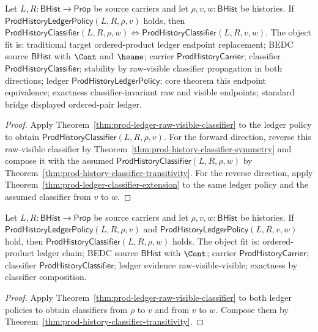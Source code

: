 \begin{theorem}
\label{thm:prod-ledger-classifier-endpoint-equivalence}
Let $L,R:\mathsf{BHist}\to\mathsf{Prop}$ be source carriers and let
$\rho,v,w:\mathsf{BHist}$ be histories. If
$\mathsf{ProdHistoryLedgerPolicy}(L,R,\rho,v)$ holds, then
$\mathsf{ProdHistoryClassifier}(L,R,\rho,w) \Longleftrightarrow
\mathsf{ProdHistoryClassifier}(L,R,v,w)$. The object fit is:
traditional target ordered-product ledger endpoint replacement; BEDC source
$\mathsf{BHist}$ with $\Cont$ and $\hsame$; carrier
$\mathsf{ProdHistoryCarrier}$; classifier $\mathsf{ProdHistoryClassifier}$;
stability by raw-visible classifier propagation in both directions; ledger
$\mathsf{ProdHistoryLedgerPolicy}$; core theorem this endpoint equivalence;
exactness classifier-invariant raw and visible endpoints; standard bridge
displayed ordered-pair ledger.
\end{theorem}
\begin{proof}
Apply Theorem~\ref{thm:prod-ledger-raw-visible-classifier} to the ledger
policy to obtain $\mathsf{ProdHistoryClassifier}(L,R,\rho,v)$. For the forward
direction, reverse this raw-visible classifier by
Theorem~\ref{thm:prod-history-classifier-symmetry} and compose it with the
assumed $\mathsf{ProdHistoryClassifier}(L,R,\rho,w)$ by
Theorem~\ref{thm:prod-history-classifier-transitivity}. For the reverse
direction, apply
Theorem~\ref{thm:prod-ledger-classifier-extension} to the same ledger policy
and the assumed classifier from $v$ to $w$.
\end{proof}

\begin{theorem}
\label{thm:prod-ledger-two-step-classifier-composition}
Let $L,R:\mathsf{BHist}\to\mathsf{Prop}$ be source carriers and let
$\rho,v,w:\mathsf{BHist}$ be histories. If
$\mathsf{ProdHistoryLedgerPolicy}(L,R,\rho,v)$ and
$\mathsf{ProdHistoryLedgerPolicy}(L,R,v,w)$ hold, then
$\mathsf{ProdHistoryClassifier}(L,R,\rho,w)$ holds. The object fit is:
ordered-product ledger chain; BEDC source $\mathsf{BHist}$ with $\Cont$;
carrier $\mathsf{ProdHistoryCarrier}$; classifier
$\mathsf{ProdHistoryClassifier}$; ledger evidence raw-visible-visible;
exactness by classifier composition.
\end{theorem}
\begin{proof}
Apply Theorem~\ref{thm:prod-ledger-raw-visible-classifier} to both ledger
policies to obtain classifiers from $\rho$ to $v$ and from $v$ to $w$. Compose
them by Theorem~\ref{thm:prod-history-classifier-transitivity}.
\end{proof}

